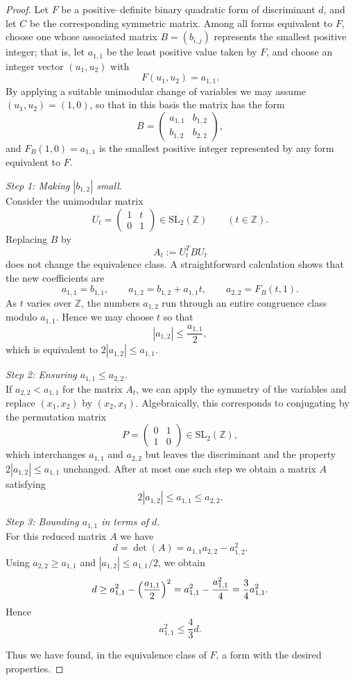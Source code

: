 \begin{proof}
\leanok
Let $F$ be a positive–definite binary quadratic form of discriminant
$d$, and let $C$ be the corresponding symmetric matrix.
Among all forms equivalent to $F$, choose one whose associated matrix
$B = (b_{i,j})$ represents the smallest positive integer; that is, let
$a_{1,1}$ be the least positive value taken by $F$, and choose an
integer vector $(u_1,u_2)$ with
\[
  F(u_1,u_2) = a_{1,1}.
\]
By applying a suitable unimodular change of variables we may assume
$(u_1,u_2) = (1,0)$, so that in this basis the matrix has the form
\[
  B =
  \begin{pmatrix}
    a_{1,1} & b_{1,2}\\[0.3em]
    b_{1,2} & b_{2,2}
  \end{pmatrix},
\]
and $F_B(1,0) = a_{1,1}$ is the smallest positive integer represented
by any form equivalent to $F$.

\noindent
\emph{Step 1: Making $|b_{1,2}|$ small.}\\
Consider the unimodular matrix
\[
  U_t =
  \begin{pmatrix}
    1 & t\\[0.3em]
    0 & 1
  \end{pmatrix}
  \in \mathrm{SL}_2(\mathbb{Z})
  \qquad (t\in\mathbb{Z}).
\]
Replacing $B$ by
\[
  A_t := U_t^T B U_t
\]
does not change the equivalence class.
A straightforward calculation shows that the new coefficients are
\[
  a_{1,1} = b_{1,1},\qquad
  a_{1,2} = b_{1,2} + a_{1,1} t,\qquad
  a_{2,2} = F_B(t,1).
\]
As $t$ varies over $\mathbb{Z}$, the numbers $a_{1,2}$ run through an
entire congruence class modulo $a_{1,1}$.
Hence we may choose $t$ so that
\[
  |a_{1,2}| \le \frac{a_{1,1}}{2},
\]
which is equivalent to $2|a_{1,2}|\le a_{1,1}$.

\noindent
\emph{Step 2: Ensuring $a_{1,1}\le a_{2,2}$.}\\
If $a_{2,2}<a_{1,1}$ for the matrix $A_t$, we can apply the symmetry
of the variables and replace $(x_1,x_2)$ by $(x_2,x_1)$.
Algebraically, this corresponds to conjugating by the permutation
matrix
\[
  P = \begin{pmatrix}0&1\\ 1&0\end{pmatrix}\in\mathrm{SL}_2(\mathbb{Z}),
\]
which interchanges $a_{1,1}$ and $a_{2,2}$ but leaves the discriminant
and the property $2|a_{1,2}|\le a_{1,1}$ unchanged.
After at most one such step we obtain a matrix $A$ satisfying
\[
  2|a_{1,2}|\le a_{1,1}\le a_{2,2}.
\]

\noindent
\emph{Step 3: Bounding $a_{1,1}$ in terms of $d$.}\\
For this reduced matrix $A$ we have
\[
  d = \det(A) = a_{1,1}a_{2,2} - a_{1,2}^2.
\]
Using $a_{2,2}\ge a_{1,1}$ and $|a_{1,2}|\le a_{1,1}/2$, we obtain
\[
  d \ge a_{1,1}^2 - \Bigl(\frac{a_{1,1}}{2}\Bigr)^2
    = a_{1,1}^2 - \frac{a_{1,1}^2}{4}
    = \frac{3}{4} a_{1,1}^2.
\]
Hence
\[
  a_{1,1}^2 \le \frac{4}{3} d.
\]

Thus we have found, in the equivalence class of $F$, a form with the
desired properties.
\end{proof}

